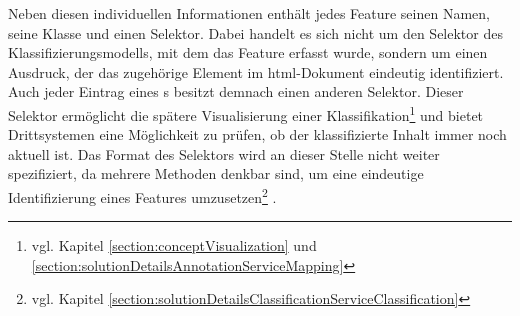         Neben diesen individuellen Informationen enthält jedes Feature
        seinen Namen, seine Klasse und einen Selektor.
        Dabei handelt es sich nicht um den Selektor des Klassifizierungsmodells,
        mit dem das Feature erfasst wurde,
        sondern um einen Ausdruck, der das zugehörige Element im \gls{html}-Dokument eindeutig identifiziert.
        Auch jeder Eintrag eines {\collectionFeature}s besitzt demnach einen anderen Selektor.
        Dieser Selektor ermöglicht die spätere Visualisierung einer
        Klassifikation\footnote{vgl. Kapitel \ref{section:conceptVisualization} und
        \ref{section:solutionDetailsAnnotationServiceMapping}}
        und bietet Drittsystemen eine Möglichkeit zu prüfen,
        ob der klassifizierte Inhalt immer noch aktuell ist.
        Das Format des Selektors wird an dieser Stelle nicht weiter spezifiziert,
        da mehrere Methoden denkbar sind, um eine eindeutige Identifizierung eines Features
        umzusetzen\footnote{vgl. Kapitel \ref{section:solutionDetailsClassificationServiceClassification}} .
